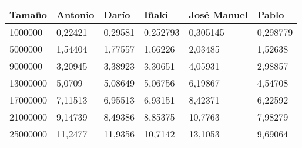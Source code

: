 \begin{tabular}{|l|l|l|l|l|l|}
	\hline
	Tamaño & Antonio & Darío & Iñaki & José Manuel & Pablo \\
	\hline
	\hline
	1000000 & 0,22421 & 0,29581 & 0,252793 & 0,305145 & 0,298779 \\
	\hline
	5000000 & 1,54404 & 1,77557 & 1,66226 & 2,03485 & 1,52638 \\
	\hline
	9000000 & 3,20945 & 3,38923 & 3,30651 & 4,05931 & 2,98857 \\
	\hline
	13000000 & 5,0709 & 5,08649 & 5,06756 & 6,19867 & 4,54708 \\
	\hline
	17000000 & 7,11513 & 6,95513 & 6,93151 & 8,42371 & 6,22592 \\
	\hline
	21000000 & 9,14739 & 8,49386 & 8,85375 & 10,7763 & 7,98279 \\
	\hline
	25000000 & 11,2477 & 11,9356 & 10,7142 & 13,1053 & 9,69064 \\
	\hline
\end{tabular}
